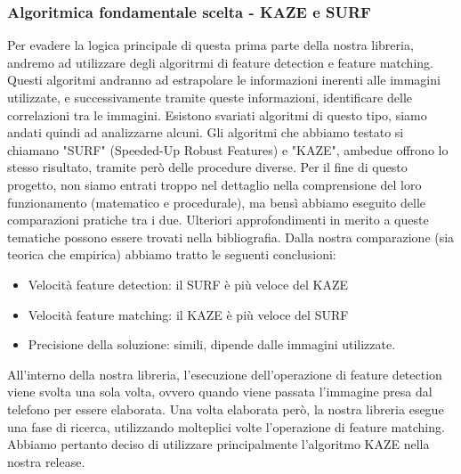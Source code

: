 \documentclass[twoside]{supsistudent}
\newcommand{\Decaa}{\newline\vspace{0.5mm}\newline\noindent}
\begin{document}
\subsubsection{Algoritmica fondamentale scelta - KAZE e SURF}
Per evadere la logica principale di questa prima parte della nostra libreria, andremo ad utilizzare degli algoritrmi di feature detection e feature matching.
Questi algoritmi andranno ad estrapolare le informazioni inerenti alle immagini utilizzate, e successivamente tramite queste informazioni, identificare delle correlazioni tra le immagini.
Esistono svariati algoritmi di questo tipo, siamo andati quindi ad analizzarne alcuni.
\Decaa
Gli algoritmi che abbiamo testato si chiamano "SURF" (Speeded-Up Robust Features) e "KAZE", ambedue offrono lo stesso risultato, tramite però delle procedure diverse. Per il fine di questo progetto, non siamo entrati troppo nel dettaglio nella comprensione del loro funzionamento (matematico e procedurale), ma bensì abbiamo eseguito delle comparazioni pratiche tra i due. Ulteriori approfondimenti in merito a queste tematiche possono essere trovati nella bibliografia.
\Decaa
Dalla nostra comparazione (sia teorica che empirica) abbiamo tratto le seguenti conclusioni:

\begin{itemize}
\item Velocità feature detection: il SURF è più veloce del KAZE
\item Velocità feature matching: il KAZE è più veloce del SURF
\item Precisione della soluzione: simili, dipende dalle immagini utilizzate.
\end{itemize}

All'interno della nostra libreria, l'esecuzione dell'operazione di feature detection viene svolta una sola volta, ovvero quando viene passata l'immagine presa dal telefono per essere elaborata. Una volta elaborata però, la nostra libreria esegue una fase di ricerca, utilizzando molteplici volte l'operazione di feature matching.
\Decaa
Abbiamo pertanto deciso di utilizzare principalmente l'algoritmo KAZE nella nostra release.

\newpage
\end{document}
